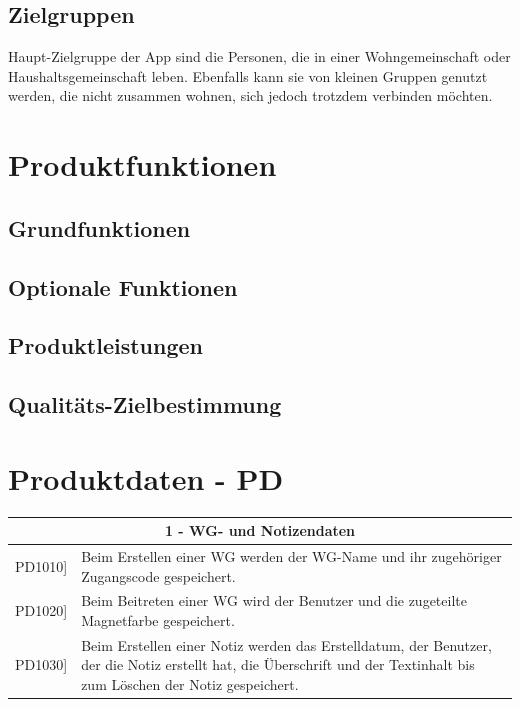\documentclass[a4paper]{scrreprt}
\begin{document}
        \section{Zielgruppen}
        Haupt-Zielgruppe der App sind die Personen, die in einer Wohngemeinschaft oder Haushaltsgemeinschaft leben. Ebenfalls kann sie von kleinen Gruppen genutzt werden, die nicht zusammen wohnen, sich jedoch trotzdem verbinden möchten.
        

    \chapter{Produktfunktionen}
    		\section{Grundfunktionen}
    		
    		\section{Optionale Funktionen}
    		
    		\section{Produktleistungen}
    		
    		\section{Qualitäts-Zielbestimmung}

    \chapter{Produktdaten - PD}
    	\begin{table}[h!]
    		\centering
    		\label{my-label}
    		\begin{tabular}{p{2cm}p{12cm}}
    			
    			\multicolumn{2}{c}{\textbf{1 - WG- und Notizendaten}} \\ \hline
    			\centering{[}PD1010{]} & Beim Erstellen einer WG werden der WG-Name und ihr zugehöriger Zugangscode gespeichert.\\
    			\centering{[}PD1020{]}& Beim Beitreten einer WG wird der Benutzer und die zugeteilte Magnetfarbe gespeichert.                                 \\
    			\centering{[}PD1030{]}& Beim Erstellen einer Notiz werden das Erstelldatum, der Benutzer, der die Notiz erstellt hat, die Überschrift und der Textinhalt bis zum Löschen der Notiz gespeichert.\\ 
    			\hline
    		\end{tabular}
    	\end{table}
        
\end{document}
